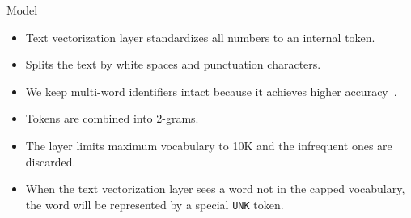\documentclass[xcolor=svgnames]{beamer}
\newcommand{\code}[1]{\texttt{#1}}
\begin{document}
\begin{frame}{Model}
\begin{itemize}
\item Text vectorization layer standardizes all numbers to an internal token.
\item Splits the text by white spaces and punctuation characters.
\item We keep multi-word identifiers intact because it achieves higher accuracy~\cite{haiduc2010use}.
\item Tokens are combined into 2-grams.
\item The layer limits maximum vocabulary to 10K and the infrequent ones are discarded.
\item When the text vectorization layer sees a word not in the capped vocabulary, the word will be represented by a special \code{UNK} token.
\end{itemize}
\end{frame}
\end{document}
